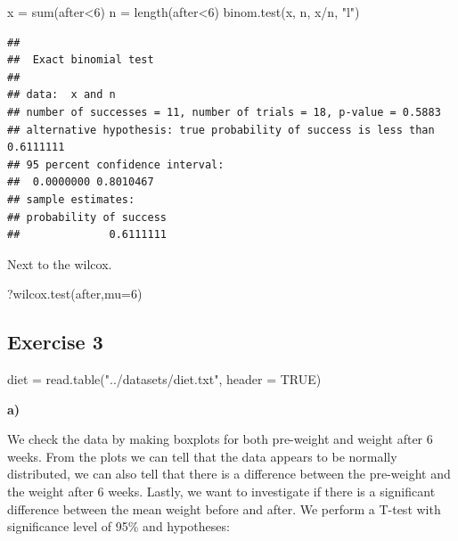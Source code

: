 \documentclass[
]{article}
\newenvironment{Shaded}{\begin{snugshade}}{\end{snugshade}}
\newcommand{\AttributeTok}[1]{\textcolor[rgb]{0.77,0.63,0.00}{#1}}
\newcommand{\ConstantTok}[1]{\textcolor[rgb]{0.00,0.00,0.00}{#1}}
\newcommand{\DecValTok}[1]{\textcolor[rgb]{0.00,0.00,0.81}{#1}}
\newcommand{\FunctionTok}[1]{\textcolor[rgb]{0.00,0.00,0.00}{#1}}
\newcommand{\NormalTok}[1]{#1}
\newcommand{\OtherTok}[1]{\textcolor[rgb]{0.56,0.35,0.01}{#1}}
\newcommand{\SpecialCharTok}[1]{\textcolor[rgb]{0.00,0.00,0.00}{#1}}
\newcommand{\StringTok}[1]{\textcolor[rgb]{0.31,0.60,0.02}{#1}}
\begin{document}
\begin{Shaded}
\begin{Highlighting}[]
\NormalTok{x }\OtherTok{=} \FunctionTok{sum}\NormalTok{(after}\SpecialCharTok{\textless{}}\DecValTok{6}\NormalTok{)}
\NormalTok{n }\OtherTok{=} \FunctionTok{length}\NormalTok{(after}\SpecialCharTok{\textless{}}\DecValTok{6}\NormalTok{)}
\FunctionTok{binom.test}\NormalTok{(x, n, x}\SpecialCharTok{/}\NormalTok{n, }\StringTok{"l"}\NormalTok{)}
\end{Highlighting}
\end{Shaded}

\begin{verbatim}
## 
##  Exact binomial test
## 
## data:  x and n
## number of successes = 11, number of trials = 18, p-value = 0.5883
## alternative hypothesis: true probability of success is less than 0.6111111
## 95 percent confidence interval:
##  0.0000000 0.8010467
## sample estimates:
## probability of success 
##              0.6111111
\end{verbatim}

Next to the wilcox.

\begin{Shaded}
\begin{Highlighting}[]
\NormalTok{?}\FunctionTok{wilcox.test}\NormalTok{(after,}\AttributeTok{mu=}\DecValTok{6}\NormalTok{)}
\end{Highlighting}
\end{Shaded}

\hypertarget{exercise-3}{%
\subsection{Exercise 3}\label{exercise-3}}

\begin{Shaded}
\begin{Highlighting}[]
\NormalTok{diet }\OtherTok{=} \FunctionTok{read.table}\NormalTok{(}\StringTok{"../datasets/diet.txt"}\NormalTok{, }\AttributeTok{header =} \ConstantTok{TRUE}\NormalTok{)}
\end{Highlighting}
\end{Shaded}

\textbf{a)}

We check the data by making boxplots for both pre-weight and weight
after 6 weeks. From the plots we can tell that the data appears to be
normally distributed, we can also tell that there is a difference
between the pre-weight and the weight after 6 weeks. Lastly, we want to
investigate if there is a significant difference between the mean weight
before and after. We perform a T-test with significance level of 95\%
and hypotheses:
\end{document}

